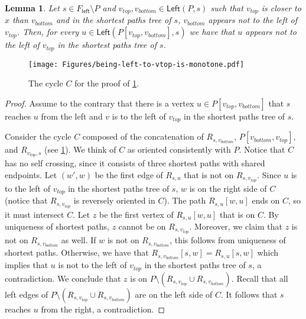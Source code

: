 \documentclass{article}
\newcommand{\Left}{\mathsf{Left}}
\newcommand{\leftside}{\mathsf{left}}
\newtheorem{lemma}{Lemma}
\begin{document}
\begin{lemma}\label{clm:being-left-to-vtop-is-monotone}
    Let $s\in F_{\leftside}\setminus P$ and $v_{top},v_{bottom}\in \Left(P,s)$ such that $v_{top}$ is closer to $x$ than $v_{bottom}$ and in the shortest paths tree of $s$, $v_{bottom}$ appears not to the left of $v_{top}$.
    Then, for every $u\in \Left(P[v_{top},v_{bottom}],s)$ we have that $u$ appears not to the left of $v_{top}$ in the shortest paths tree of $s$.
\end{lemma}
\begin{figure}[ht]
    \centering
    \texttt{[image: Figures/being-left-to-vtop-is-monotone.pdf]}
    \caption{The cycle $C$ for the proof of \cref{clm:being-left-to-vtop-is-monotone}.}
    \label{fig:being-left-to-vtop-is-monotone}
\end{figure}
\begin{proof}
    Assume to the contrary that there is a vertex $u\in P[v_{top},v_{bottom}]$ that $s$ reaches $u$ from the left and $v$ is to the left of $v_{top}$ in the shortest paths tree of $s$.

    Consider the cycle $C$ composed of the concatenation of $R_{s,v_{bottom}}$, $P[v_{bottom},v_{top}]$, and $R_{v_{top},s}$ (see \cref{fig:being-left-to-vtop-is-monotone}).
    We think of $C$ as oriented consistently with $P$.
    Notice that $C$ has no self crossing, since it consists of three shortest paths with shared endpoints.
    Let $(w',w)$ be the first edge of $R_{s,u}$ that is not on $R_{s,v_{top}}$.
    Since $u$ is to the left of $v_{top}$ in the shortest paths tree of $s$, $w$ is on the right side of $C$ (notice that $R_{s,v_{top}}$ is reversely oriented in $C$).
    The path $R_{s,u}[w,u]$ ends on $C$, so it must intersect $C$.
    Let $z$ be the first vertex of $R_{s,u}[w,u]$ that is on $C$.
    By uniqueness of shortest paths, $z$ cannot be on $R_{s,v_{top}}$.
    Moreover, we claim that $z$ is not on $R_{s,v_{bottom}}$ as well.
    If $w$ is not on $R_{s,v_{bottom}}$, this follows from uniqueness of shortest paths.
    Otherwise, we have that $R_{s,v_{bottom}}[s,w] = R_{s,u}[s,w]$ which implies that $u$ is not to the left of $v_{top}$ in the shortest paths tree of $s$, a contradiction.
    We conclude that $z$ is on $P\setminus (R_{s,v_{top}}\cup R_{s,v_{bottom}})$.
    Recall that all left edges of $P\setminus (R_{s,v_{top}}\cup R_{s,v_{bottom}})$ are on the left side of $C$.
    It follows that $s$ reaches $u$ from the right, a contradiction.
\end{proof}
\end{document}
